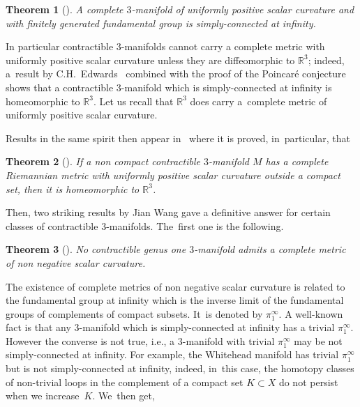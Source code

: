 \documentclass[pdftex]{sigma}
\numberwithin{equation}{section}
\newtheorem{theor}{Theorem}[section]
\begin{document}
\begin{theor}[{\cite[Corollary~10.9]{GromovLawson}}]
A complete $3$-manifold of uniformly positive scalar curvature and with finitely generated fundamental group is simply-connected at infinity.
\end{theor}

In particular contractible $3$-manifolds cannot carry a complete metric with uniformly positive scalar curvature unless they are diffeomorphic to $\mathbb{R}^{3}$; indeed, a~result by C.H.~Edwards~\cite{Edw} combined
with the proof of the Poincar\'e conjecture shows that a contractible $3$-manifold which is simply-connected at infinity is homeomorphic to $\mathbb{R}^3$. Let us recall that $\mathbb{R}^3$ does carry a~complete metric of uniformly positive scalar curvature.

Results in the same spirit then appear in~\cite{cwy:taming} where it is proved, in~particular, that

\begin{theor}[{\cite[Theorem~4.4]{cwy:taming}}]\label{cwy}
If a non compact contractible $3$-manifold $M$ has a complete Riemannian metric with uniformly positive scalar curvature outside a compact set, then it is homeomorphic to $\mathbb{R}^{3}$.
\end{theor}

Then, two striking results by Jian Wang gave a definitive answer for certain classes of contractible $3$-manifolds. The~first one is the following.

\begin{theor}[\cite{Wang1}]\label{Wang1}
No contractible genus one $3$-manifold admits a complete metric of non negative scalar curvature.
\end{theor}

The existence of complete metrics of non negative scalar curvature is related to the fundamental group at infinity which is the inverse limit of the fundamental groups of complements of compact subsets. It~is denoted by $\pi_1^{\infty}$. A well-known fact is that any $3$-manifold which is simply-connected at infinity has a trivial $\pi^\infty_1$. However the converse is not true, i.e., a $3$-manifold with trivial $\pi_{1}^{\infty}$ may be not simply-connected at infinity. For example, the Whitehead manifold has trivial $\pi_{1}^{\infty}$ but is not simply-connected at infinity, indeed, in~this case, the homotopy classes of non-trivial loops in
the complement of a compact set $K\subset X$ do not persist when we increase~$K$. We~then get,
\end{document}
